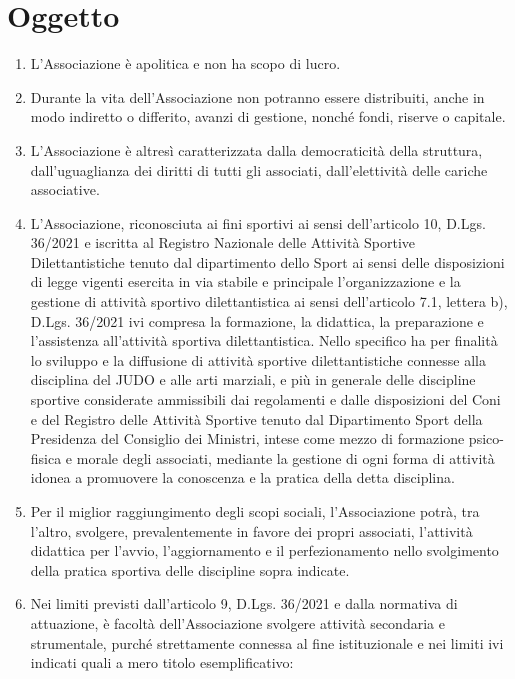 \documentclass{djtsdoc}
\begin{document}
	\section{Oggetto}
	\begin{enumerate}
		\item L'Associazione è apolitica e non ha scopo di lucro.
		\item Durante la vita dell'Associazione non potranno essere distribuiti, anche in modo indiretto o differito, avanzi di gestione, nonché fondi, riserve o capitale.
		\item L'Associazione è altresì caratterizzata dalla democraticità della struttura, dall'uguaglianza dei diritti di tutti gli associati, dall'elettività delle cariche associative.
		\item L'Associazione, riconosciuta ai fini sportivi ai sensi dell'articolo 10, D.Lgs. 36/2021 e iscritta al Registro Nazionale delle Attività Sportive Dilettantistiche  tenuto dal dipartimento dello Sport ai sensi delle disposizioni di legge vigenti esercita in via stabile e principale l'organizzazione e la gestione di attività sportivo dilettantistica ai sensi dell'articolo 7.1, lettera b), D.Lgs. 36/2021 ivi compresa la formazione, la didattica, la preparazione e l'assistenza all'attività sportiva dilettantistica. Nello specifico ha per finalità lo sviluppo e la diffusione di attività sportive dilettantistiche connesse alla disciplina del JUDO  e alle arti marziali, e più in generale delle discipline sportive considerate ammissibili dai regolamenti e dalle disposizioni del Coni e del Registro delle Attività Sportive tenuto dal Dipartimento Sport della Presidenza del Consiglio dei Ministri, intese come mezzo di formazione psico-fisica e morale degli associati, mediante la gestione di ogni forma di attività idonea a promuovere la conoscenza e la pratica della detta disciplina.
		\item Per il miglior raggiungimento degli scopi sociali, l'Associazione potrà, tra l'altro, svolgere, prevalentemente in favore dei propri associati, l'attività didattica per l'avvio, l'aggiornamento e il perfezionamento nello svolgimento della pratica sportiva delle discipline sopra indicate.
		\item Nei limiti previsti dall'articolo 9, D.Lgs. 36/2021 e dalla normativa di attuazione, è facoltà dell'Associazione svolgere attività secondaria e strumentale, purché strettamente connessa al fine istituzionale e nei limiti ivi indicati quali a mero titolo esemplificativo:
		\begin{itemize}

\end{itemize}
\end{enumerate}
\end{document}
